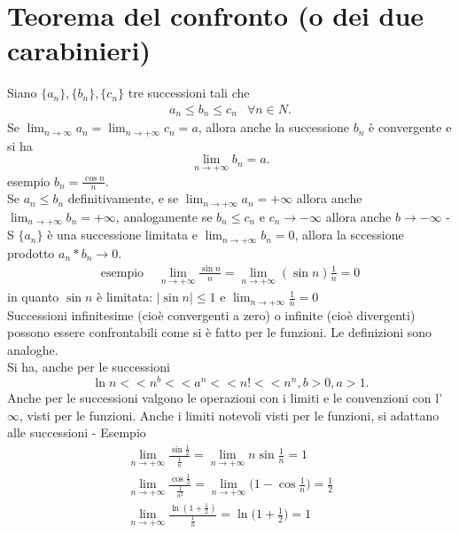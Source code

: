 \section{Teorema del confronto (o dei due carabinieri)}
Siano $\{a_n\},\{b_n\},\{c_n\}$ tre successioni tali che
\begin{eqnarray*}
	a_n\leq b_n\leq c_n&\forall n\in N.
\end{eqnarray*}
Se $\lim_{n\to \infty} a_n=\lim_{n\to +\infty} c_n=a$, allora anche la successione $b_n$ è convergente e si ha
\begin{equation*}
	\lim_{n\to +\infty}b_n=a.
\end{equation*}
esempio $b_n=\frac{\cos n}{n}$.\\
Se $a_n \leq b_n$ definitivamente, e se $\lim_{n\to+\infty}a_n=+\infty$ allora anche $\lim_{n\to +\infty}b_n=+\infty$, analogamente se $b_n\leq c_n$ e $c_n\to -\infty$ allora anche $b\to -\infty$ - S $\{a_n\}$ è una successione limitata e $\lim_{n\to +\infty}b_n=0$, allora la sccessione prodotto $a_n*b_n\to 0$. 
\begin{eqnarray*}
	\text{esempio }&\lim_{n\to +\infty}\frac{\sin n}{n}=\lim_{n\to+\infty}(\sin n)\frac{1}{n}=0
\end{eqnarray*}
in quanto $\sin n$ è limitata: $|\sin n|\leq 1$ e $\lim_{n\to+\infty}\frac{1}{n}=0$\\
Successioni infinitesime (cioè convergenti a zero) o infinite (cioè divergenti) possono essere confrontabili come si è fatto per le funzioni. Le definizioni sono analoghe.\\
Si ha, anche per le successioni
\begin{equation*}
	\ln n<<n^b<<a^n<<n!<<n^n, b>0, a>1.
\end{equation*}
Anche per le successioni valgono le operazioni con i limiti e le convenzioni con l’$\infty$, visti per le funzioni.
Anche i limiti notevoli visti per le funzioni, si adattano alle successioni - Esempio
\begin{eqnarray*}
	\lim_{n\to+\infty}\frac{\sin\frac{1}{2}}{\frac{1}{n}}=\lim_{n\to+\infty} n\sin\frac{1}{n}=1\\
	\lim_{n\to+\infty}\frac{\cos\frac{1}{2}}{\frac{1}{n^2}}=\lim_{n\to+\infty}\bigg(1-\cos\frac{1}{n}\bigg)=\frac{1}{2}\\
	\lim_{n\to+\infty}\frac{\ln(1+\frac{1}{2})}{\frac{1}{n}}=\ln\bigg(1+\frac{1}{2}\bigg)=1
\end{eqnarray*}
